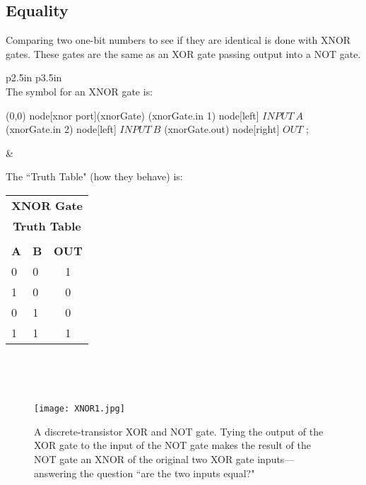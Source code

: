 \clearpage

\subsection*{Equality}

Comparing two one-bit numbers to see if they are identical is done with XNOR gates. These gates are the same as an XOR gate passing output into a NOT gate. 

\medskip
\begin{center}

\begin{tabular}{p{2.5in} p{3.5in} }
\hline\\[\negsep]

The symbol for an XNOR gate is:

\vspace{0.25in}

\begin{circuitikz}
\draw
	(0,0) node[xnor port](xnorGate) {}
	(xnorGate.in 1) node[left] {{\color{red}$INPUT~A$}}
	(xnorGate.in 2) node[left] {{\color{red}$INPUT~B$}}
	(xnorGate.out) node[right] {{\color{red}$OUT$}}
;
\end{circuitikz}

&

\centering

The ``Truth Table" (how they behave) is: 
\vspace{0.15in}

\begin{tabular}{ll | c}
\multicolumn{3}{c}{\textbf{XNOR Gate }}\\
\multicolumn{3}{c}{\textbf{Truth Table}}\\
\hline\\[\negsep]
\textbf{A} & \textbf{B} & \textbf{OUT}\\
\hline
0 & 0 & 1  \\
1 & 0 & 0  \\
0 & 1 & 0  \\
1 & 1 & 1  \\
\hline
\end{tabular}
\\
\tabularnewline

\hline\\[\negsep]

\end{tabular}
\end{center}

\bigskip

\begin{figure}[hb!]
\begin{center}
\texttt{[image: XNOR1.jpg]}
\caption{A discrete-transistor XOR and NOT gate. Tying the output of the XOR gate to the input of the NOT gate makes the result of the NOT gate an XNOR of the original two XOR gate inputs---answering the question ``are the two inputs equal?"}
\end{center}
\end{figure}


